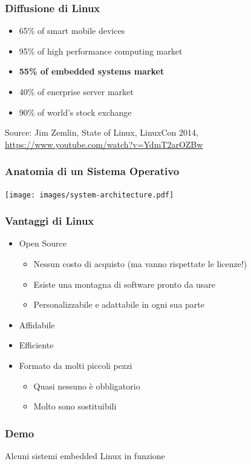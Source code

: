 \documentclass[xetex,table]{beamer}
\begin{document}
\begin{frame}
\frametitle{Diffusione di Linux}
  \begin{itemize}
    \item 65\% of smart mobile devices
    \item 95\% of high performance computing market
    \item \textbf{55\% of embedded systems market}
    \item 40\% of enerprise server market
    \item 90\% of world’s stock exchange
  \end{itemize}
  {\tiny Source: Jim Zemlin, State of Linux, LinuxCon 2014,
    \url{https://www.youtube.com/watch?v=YdmT2arOZBw}}
\end{frame}

\begin{frame}
\frametitle{Anatomia di un Sistema Operativo}
  \begin{center}
    \texttt{[image: images/system-architecture.pdf]}
  \end{center}
\end{frame}

\begin{frame}
\frametitle{Vantaggi di Linux}
  \begin{itemize}
    \item Open Source
    \begin{itemize}
      \item Nessun costo di acquisto (ma vanno rispettate le licenze!)
      \item Esiste una montagna di software pronto da usare
      \item Personalizzabile e adattabile in ogni sua parte
    \end{itemize}
    \item Affidabile
    \item Efficiente
    \item Formato da molti piccoli pezzi
    \begin{itemize}
      \item Quasi nessuno è obbligatorio
      \item Molto sono sostituibili
    \end{itemize}
  \end{itemize}
\end{frame}

\begin{frame}
\frametitle[Demo! Alcuni sistemi Linux embedded in funzione]{Demo}
  \begin{center}
    \LARGE
    Alcuni sistemi embedded Linux in funzione
  \end{center}
\end{frame}
\end{document}
